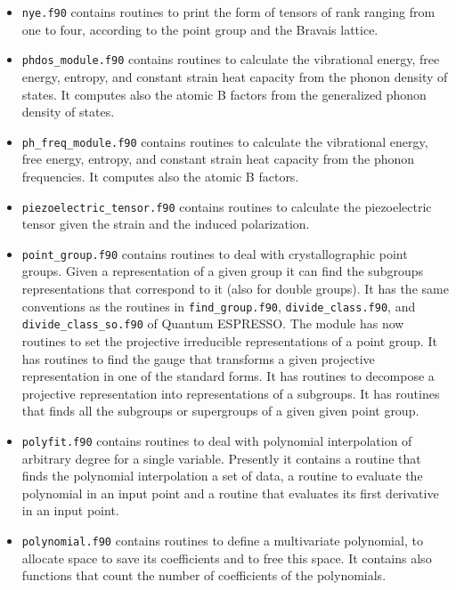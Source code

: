 \documentclass[12pt,a4paper]{article}
\def\qe{{\sc Quantum ESPRESSO}}
\begin{document}
\begin{itemize}
\item
\texttt{nye.f90} contains routines to print the form of tensors of
rank ranging from one to four, according to the point group and the
Bravais lattice.

\item
\texttt{phdos\_module.f90} contains routines to calculate the vibrational
energy, free energy, entropy, and constant strain heat capacity from the
phonon density of states. It computes also the atomic B factors from the
generalized phonon density of states.

\item
\texttt{ph\_freq\_module.f90} contains routines to calculate the vibrational
energy, free energy, entropy, and constant strain heat capacity from the
phonon frequencies. It computes also the atomic B factors.

\item
\texttt{piezoelectric\_tensor.f90} contains routines to calculate the
piezoelectric tensor given the strain and the induced polarization.

\item
\texttt{point\_group.f90} contains routines to deal with crystallographic
point groups. Given a representation of a given group it can find 
the subgroups representations that correspond to it (also for
double groups). It has the same conventions as the routines 
in \texttt{find\_group.f90}, \texttt{divide\_class.f90}, and 
\texttt{divide\_class\_so.f90} of \qe. The module has now routines to
set the projective irreducible representations of a point group.
It has routines to find the gauge that transforms a given projective
representation in one of the standard forms. It has routines to decompose
a projective representation into representations of a subgroups.
It has routines that finds all the subgroups or supergroups of a given given
point group.

\item
\texttt{polyfit.f90} contains routines to deal with polynomial
interpolation of arbitrary degree for a single variable. Presently
it contains a routine that finds the polynomial interpolation a set of data,
a routine to evaluate the polynomial in an input point and a routine
that evaluates its first derivative in an input point.

\item
\texttt{polynomial.f90} contains routines to define a multivariate 
polynomial, to allocate space to save its coefficients and to free this
space. It contains also functions that count the number of coefficients 
of the polynomials.


\end{itemize}
\end{document}
